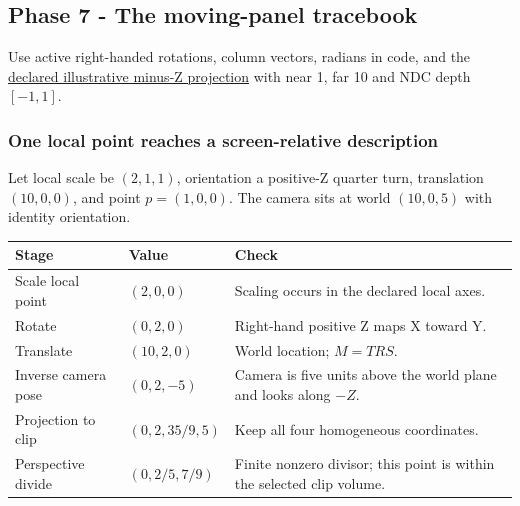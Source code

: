 \subsection{Phase 7 - The moving-panel tracebook}\label{appendix-92ff77d4dfdc-phase-7---the-moving-panel-tracebook}

Use active right-handed rotations, column vectors, radians in code, and the \hyperref[01-foundations-i-ch019-figure-m6---follow-one-point-through-named-spaces]{declared illustrative minus-Z projection} with near 1, far 10 and NDC depth \([-1,1]\).

\subsubsection{One local point reaches a screen-relative description}\label{appendix-92ff77d4dfdc-one-local-point-reaches-a-screen-relative-description}

Let local scale be \((2,1,1)\), orientation a positive-Z quarter turn, translation \((10,0,0)\), and point \(p=(1,0,0)\). The camera sits at world \((10,0,5)\) with identity orientation.

{\def\LTcaptype{none} %
\begin{longtable}[]{@{}
  >{\raggedright\arraybackslash}p{}
  >{\raggedright\arraybackslash}p{}
  >{\raggedright\arraybackslash}p{}@{}}
\toprule\noalign{}
\begin{minipage}[b]{\linewidth}\raggedright
Stage
\end{minipage} & \begin{minipage}[b]{\linewidth}\raggedright
Value
\end{minipage} & \begin{minipage}[b]{\linewidth}\raggedright
Check
\end{minipage} \\
\midrule\noalign{}
\endhead
\bottomrule\noalign{}
\endlastfoot
Scale local point & \((2,0,0)\) & Scaling occurs in the declared local axes. \\
Rotate & \((0,2,0)\) & Right-hand positive Z maps X toward Y. \\
Translate & \((10,2,0)\) & World location; \(M=TRS\). \\
Inverse camera pose & \((0,2,-5)\) & Camera is five units above the world plane and looks along \(-Z\). \\
Projection to clip & \((0,2,35/9,5)\) & Keep all four homogeneous coordinates. \\
Perspective divide & \((0,2/5,7/9)\) & Finite nonzero divisor; this point is within the selected clip volume. \\
\end{longtable}
}

